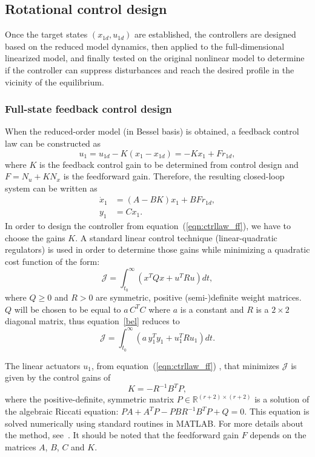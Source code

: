 \documentclass[12pt]{iopart}
\begin{document}
\subsection{Rotational control design} 
Once the target states $\left( x_{1d} , u_{1d} \right)$ are established, the controllers are designed based on the reduced model dynamics, then applied to the full-dimensional linearized model, and finally tested on the original nonlinear model to determine if the controller can suppress disturbances and reach the desired profile in the vicinity of the equilibrium.


\subsubsection{Full-state feedback control design} 

When the reduced-order model (in Bessel basis) is obtained, a feedback control law can be constructed as
\begin{equation}
   u_1 = u_{1d} - K(x_1 - x_{1d}) = - Kx_1 + Fr_{1d},
   \label{eqn:ctrllaw_ff}
\end{equation}
where $K$ is the feedback control gain to be determined from control design and $F = N_u + K N_x$ is the feedforward gain.  Therefore, the resulting closed-loop system can be written as
\begin{eqnarray}
      \dot{x}_1 &= (A-BK) x_1 + BF r_{1d}, \\
      y_1 &= C x_1.
\end{eqnarray}
In order to design the controller from equation~(\ref{eqn:ctrllaw_ff}), we have to choose the gains $K$.
A  standard linear control technique (linear-quadratic regulators) is used in order to determine those gains while minimizing a quadratic cost function of the form:
\begin{equation}
 \mathcal{J} = \int_{t_0}^\infty \left( x^T Q x + u^T R u \right) dt,
 \label{bel}
\end{equation}
where $Q\ge 0$ and $R>0$ are symmetric, positive (semi-)definite weight matrices. $Q$ will be chosen to be equal to $a \, C^{T} C$ where $a$ is a constant and $R$ is a $2 \times 2$ diagonal matrix, thus equation~\ref{bel} reduces to
\begin{equation}
   \mathcal{J} = \int_{t_0}^\infty \left( a \, y_1^T y_1 + u_1^T R u_1 \right) dt.
\end{equation}

 
The linear actuators $u_1$, from equation~(\ref{eqn:ctrllaw_ff}) , that minimizes $\mathcal{J}$ is given by the control gains of
\begin{equation}
   K  = - R^{-1} B^T P,
\end{equation}
where the positive-definite, symmetric matrix $P \in \mathbb{R}^{(r+2) \times (r+2)}$ is a solution of the algebraic Riccati equation: $P {A} + {A}^T P - P {B} R^{-1} B^T P + Q = 0$.  This equation is solved numerically using standard routines in MATLAB. For more details about the method, see~\cite{SandP, AandM, Stengel}.
It should be noted that the feedforward gain $F$  depends on the matrices $A$, $B$, $C$ and $K$.
\end{document}
